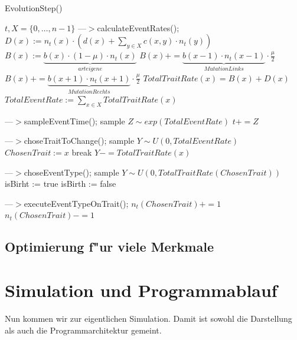 \documentclass[11pt, a4paper, german]{article}
\begin{document}
	\begin{algorithm}[H]
		\caption{EvolutionStep()}
		\begin{algorithmic}[1]
			\REQUIRE $ t, X = \{0,\dots, n-1\} $
			\STATE ---$>$calculateEventRates();
				\STATE $  D(x) := n_t(x) \cdot \left( d(x) + \sum_{y \in X} c(x,y) \cdot n_t(y) \right) $
				\STATE $ B(x) := \underbrace{b(x) \cdot (1 - \mu) \cdot n_t(x)}_{arteigene}  $
					\STATE $ B(x) += \underbrace{b(x-1)\cdot n_t(x-1)}_{Mutation Links} \cdot \frac{\mu}{2} $
				\ENDIF
					\STATE $ B(x) += \underbrace{b(x+1)\cdot n_t(x+1)}_{Mutation Rechts} \cdot \frac{\mu}{2} $
				\ENDIF
				\STATE $ TotalTraitRate(x) = B(x) + D(x) $
			\ENDFOR
			\STATE $ TotalEventRate := \sum_{x \in X} TotalTraitRate(x) $
			
			\STATE ---$>$sampleEventTime();
			\STATE sample $ Z \sim exp(TotalEventRate) $
			\STATE $ t += Z $
			
			\STATE ---$>$choseTraitToChange();
			\STATE sample $ Y \sim U(0,TotalEventRate) $
					\STATE $ ChosenTrait := x $
					\STATE break
				\ENDIF
				\STATE $ Y -= TotalTraitRate(x) $
			\ENDFOR
			
			\STATE ---$>$choseEventType();
			\STATE sample $ Y \sim U(0,TotalTraitRate(ChosenTrait)) $
				\STATE isBirht := true
			\ELSE
				\STATE isBirth := false
			\ENDIF
			
			\STATE ---$>$executeEventTypeOnTrait();
				\STATE $ n_t(ChosenTrait) += 1 $
			\ELSE
					\STATE $ n_t(ChosenTrait) -= 1 $
				\ENDIF
			\ENDIF
		\end{algorithmic}
	\end{algorithm}
	
	\subsection{Optimierung f"ur viele Merkmale}
	
\clearpage

\section{Simulation und Programmablauf}

Nun kommen wir zur eigentlichen Simulation. Damit ist sowohl die Darstellung als auch die Programmarchitektur gemeint. 
\end{document}

